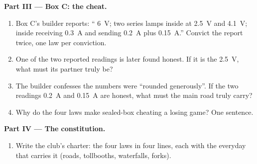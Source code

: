 \begin{problem}
\medskip\noindent\textbf{Part III --- Box C: the cheat.}
\begin{enumerate}[resume]
  \item Box C's builder reports: `` \qty{6}{V}; two
        series lamps inside at \qty{2.5}{V} and \qty{4.1}{V};
         inside receiving \qty{0.3}{A} and sending
        \qty{0.2}{A} plus \qty{0.15}{A}.'' Convict the report
        twice, one law per conviction.
  \item One of the two reported  readings is later
        found honest. If it is the \qty{2.5}{V}, what must its
        partner truly be?
  \item The builder confesses the  numbers were
        ``rounded generously''. If the two  readings
        \qty{0.2}{A} and \qty{0.15}{A} are honest, what must
        the main road truly carry?
  \item Why do the four laws make sealed-box cheating a losing
        game? One sentence.
\end{enumerate}

\medskip\noindent\textbf{Part IV --- The constitution.}
\begin{enumerate}[resume]
  \item Write the club's charter: the four laws in four lines,
        each with the everyday  that carries it (roads,
        tollbooths, waterfalls, forks).
\end{enumerate}
\end{problem}
